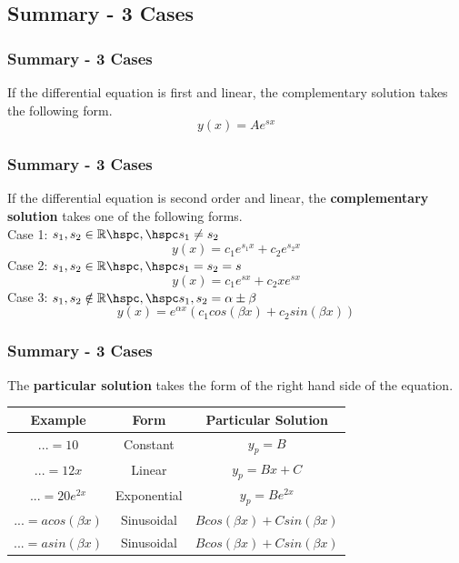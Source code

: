 \documentclass[fleqn]{beamer} %
\newcommand{\sectionIIIsubsectionVtitle}{Summary - 3 Cases}
\begin{document}
		\subsection{\sectionIIIsubsectionVtitle}\label{sectionIIIsubsectionV}	

			\begin{frame}
				\frametitle{\sectionIIIsubsectionVtitle}
				\bigskip

				If the differential equation is first and linear, the complementary solution takes the following form. \\

				\[y(x)=Ae^{sx}\] 

				\btVFill 
			\end{frame}

			\begin{frame}
				\frametitle{\sectionIIIsubsectionVtitle}
				\bigskip

				If the differential equation is second order and linear, the {\bf complementary solution } takes one of the following forms. \vspace{2mm}\\

				Case 1: $s_1,s_2\in\mathbb{R} \hspc,\hspc s_1\neq s_2$ 
				\[y(x)=c_1e^{s_1x}+c_2e^{s_2x}\] \vspace{2mm}
				Case 2: $s_1,s_2\in\mathbb{R} \hspc,\hspc s_1=s_2=s$
				\[y(x)=c_1e^{sx}+c_2xe^{sx}\] \vspace{2mm}
				Case 3: $s_1,s_2\notin\mathbb{R} \hspc,\hspc s_1,s_2 = \alpha\pm\beta$
				\[y(x)=e^{\alpha x}\left(c_1 cos\left(\beta x\right)+c_2 sin\left(\beta x\right) \right)\]
				
				\btVFill 
			\end{frame}

			\begin{frame}
				\frametitle{\sectionIIIsubsectionVtitle}
				\bigskip

				The {\bf particular solution} takes the form of the right hand side of the equation. \vspace{2mm}\\ 
				\renewcommand{\arraystretch}{1.5}
				\begin{tabular}{|c|c|c|}
					
					Example & Form & Particular Solution \\ \hline
					
					$... = 10$   & Constant & $y_p=B$ \\
					$... = 12x$  & Linear   & $y_p=Bx+C$\\
					$... = 20e^{2x} $ & Exponential & $y_p=Be^{2x}$ \\
					$... = a cos\left(\beta x\right)$& Sinusoidal &$ Bcos\left(\beta x\right)+Csin\left(\beta x\right)$ \\
					$... = a sin\left(\beta x\right)$& Sinusoidal &$ Bcos\left(\beta x\right)+Csin\left(\beta x\right)$ \\
					
				\end{tabular}

				
				\btVFill 
			\end{frame}
\end{document}
